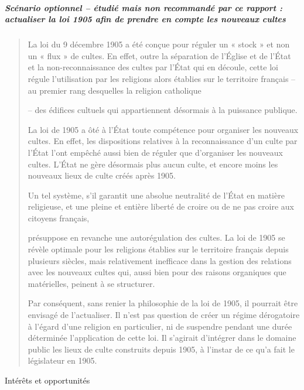 \hypertarget{scuxe9nario-optionnel-uxe9tudiuxe9-mais-non-recommanduxe9-par-ce-rapport-actualiser-la-loi-1905-afin-de-prendre-en-compte-les-nouveaux-cultes}{%
\subparagraph{Scénario optionnel -- étudié mais non recommandé par ce
rapport : actualiser la loi 1905 afin de prendre en compte les nouveaux
cultes}\label{scuxe9nario-optionnel-uxe9tudiuxe9-mais-non-recommanduxe9-par-ce-rapport-actualiser-la-loi-1905-afin-de-prendre-en-compte-les-nouveaux-cultes}}

\begin{quote}
La loi du 9 décembre 1905 a été conçue pour réguler un « stock » et non
un « flux » de cultes. En effet, outre la séparation de l'Église et de
l'État et la non-reconnaissance des cultes par l'État qui en découle,
cette loi régule l'utilisation par les religions alors établies sur le
territoire français -- au premier rang desquelles la religion catholique

-- des édifices cultuels qui appartiennent désormais à la puissance
publique.

La loi de 1905 a ôté à l'État toute compétence pour organiser les
nouveaux cultes. En effet, les dispositions relatives à la
reconnaissance d'un culte par l'État l'ont empêché aussi bien de réguler
que d'organiser les nouveaux cultes. L'État ne gère désormais plus aucun
culte, et encore moins les nouveaux lieux de culte créés après 1905.

Un tel système, s'il garantit une absolue neutralité de l'État en
matière religieuse, et une pleine et entière liberté de croire ou de ne
pas croire aux citoyens français,



présuppose en revanche une autorégulation des cultes. La loi de 1905 se
révèle optimale pour les religions établies sur le territoire français
depuis plusieurs siècles, mais relativement inefficace dans la gestion
des relations avec les nouveaux cultes qui, aussi bien pour des raisons
organiques que matérielles, peinent à se structurer.

Par conséquent, sans renier la philosophie de la loi de 1905, il
pourrait être envisagé de l'actualiser. Il n'est pas question de créer
un régime dérogatoire à l'égard d'une religion en particulier, ni de
suspendre pendant une durée déterminée l'application de cette loi. Il
s'agirait d'intégrer dans le domaine public les lieux de culte
construits depuis 1905, à l'instar de ce qu'a fait le législateur en
1905.
\end{quote}

Intérêts et opportunités

